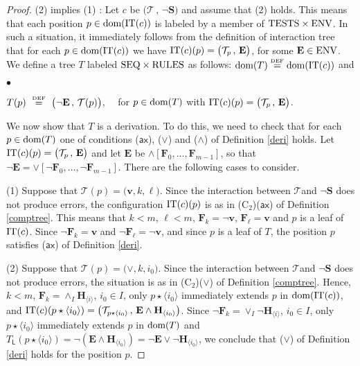 \documentclass[copyright,creativecommons]{eptcs}
\newcommand{\vv}{\langle}
\newcommand{\ww}{\rangle}
\newcommand{\axi}{\mathsf{ax}}
\newcommand{\eqdef}{\stackrel{\text{\tiny \textnormal{DEF}}}{=}}
\newcommand{\cT}{\mathcal{T}}
\newcommand{\Dis}[1]{\big( #1 \big)}
\newcommand{\bF}{\mathbf{F}}
\newcommand{\bH}{\mathbf{H}}
\newcommand{\bS}{\mathbf{S}}
\newcommand{\bE}{\mathbf{E}}
\newcommand{\bbv}{\mathbf{v}}
\newcommand{\dom}{\ensuremath{\textnormal{dom}}}
\newcommand{\seq}{\textnormal{SEQ}}
\newcommand{\rules}{\textnormal{RULES}}
\newcommand{\TES}{\textnormal{TESTS}}
\newcommand{\envir}{\textnormal{ENV}}
\newcommand{\CT}{\textnormal{IT}}
\newcommand{\sL}{\mathsf{L}}
\theoremstyle{definition}
\newcommand{\squishlist}{
 \begin{list}{$\bullet$}
  { \setlength{\itemsep}{0pt}
     \setlength{\parsep}{3pt}
     \setlength{\topsep}{3pt}
     \setlength{\partopsep}{0pt}
     \setlength{\leftmargin}{1em}
     \setlength{\labelwidth}{1.5em}
     \setlength{\labelsep}{0.5em} } }
\newcommand{\squishend}{
  \end{list}  }
\begin{document}
\begin{proof}
\vspace{0.05cm}

  (2) implies (1)   :      Let $c$ be $\big( \cT  \, , \, \neg\bS    \big)$ and assume that (2) holds.
This means that each position $p \in \dom(\CT(c))$
 is labeled by a member of $\TES \times \envir$.  In  such a situation, it immediately  follows from the definition of interaction tree that     for each
 $p \in \dom(\CT(c))$ we have
$\CT(c)(p) = \big( \cT_p \, , \, \bE    \big)$, for some
 $\bE \in \envir$.
We  define a tree $T$ labeled $\seq \times \rules$ as follows: $\dom(T)  \eqdef   \dom(\CT(c))$ and  \squishlist
\item[] {\centering
 $T(p) \ \eqdef \     \big(\neg \bE \, , \, \cT(p)\big)$\enspace, \ \
 for  $ p  \in \dom(T)$  with   $\CT(c)(p) = \big(\cT_p \, , \, \bE\big)$\enspace.
 \par}

\squishend
We now show that $T$ is a derivation. To do this,
we need to check that for each $p \in \dom(T)$
one of    conditions  ($\axi$),  ($\vee$) and  ($\wedge$) of Definition
\ref{deri} holds.
Let  $\CT(c)(p) = \big( \cT_p \, , \, \bE \big)$ and let $\bE$ be $\wedge[\bF_{0},\ldots,\bF_{m-1}]$, so that
$\neg \bE = \vee[\neg\bF_{0},\ldots,\neg\bF_{m-1}]$. There are the following cases to consider.



(1) Suppose that $\cT(p) = \Dis{\bbv , k , \ell}$.
Since the interaction between \/$\cT$\@ and  \/$\neg \bS$\@
 does not produce errors, the configuration
$\CT(c)(p)$
is as  in (C$_2$)($\axi$)
 of Definition \ref{comptree}. This means that
 $k < m$, $\ell < m$,
 $ \bF_k = \neg \bbv$,
 $ \bF_\ell =  \bbv$ and
  $p$ is a leaf of $\CT(c)$.  Since $\neg\bF_k = \bbv$ and
 $\neg\bF_\ell = \neg \bbv$,  and since  $p$ is  a leaf of $T$, the position
 $p$ satisfies   ($\axi$) of Definition
\ref{deri}.



(2) Suppose that $\cT(p) = \Dis{\vee , k , i_0}$. Since the interaction between \/$\cT$\@ and  \/$\neg \bS$\@
 does not produce errors,  the situation is as in
 (C$_2$)($\vee$)
 of Definition \ref{comptree}. Hence,
 $k < m$,
 $ \bF_k = \wedge_{I} \bH_{\vv i \ww}$, $i_0 \in I$,
 only $p \star \vv i_0 \ww$ immediately extends $ p$ in $\dom(\CT(c))$,
 and   $\CT(c)(p \star \vv i_0 \ww) = \big( \cT_{p \star \vv i_0 \ww}   \, , \, \bE \wedge \bH_{\vv i_0 \ww} \big)$.
  Since  $\neg \bF_k = \vee_{I} \neg \bH_{\vv i \ww}$,
  $i_0 \in I$,
 only $p \star \vv i_0 \ww$ immediately extends $ p$ in $\dom(T)$
 and   $T_\sL(p \star \vv i_0 \ww) = \neg(\bE \wedge \bH_{\vv i_0 \ww}) = \neg \bE \vee \neg \bH_{\vv i_0 \ww}$, we conclude that
 ($\vee$) of Definition
\ref{deri} holds for the position $p$.




\end{proof}
\end{document}
